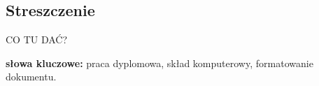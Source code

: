 \subsection*{Streszczenie}


CO TU DAĆ?


\vspace{1cm}
\noindent\textbf{słowa kluczowe:} praca dyplomowa, skład komputerowy, formatowanie dokumentu.